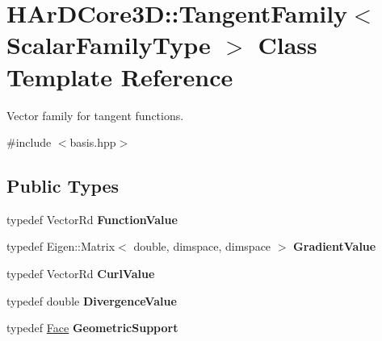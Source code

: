 \hypertarget{classHArDCore3D_1_1TangentFamily}{}\section{H\+Ar\+D\+Core3D\+:\+:Tangent\+Family$<$ Scalar\+Family\+Type $>$ Class Template Reference}
\label{classHArDCore3D_1_1TangentFamily}


Vector family for tangent functions.  




{\ttfamily \#include $<$basis.\+hpp$>$}

\subsection*{Public Types}
\begin{DoxyCompactItemize}
\item 
\mbox{\label{classHArDCore3D_1_1TangentFamily_a1124b8f08d201215ca7b2158460ad7f5}} 
typedef Vector\+Rd {\bfseries Function\+Value}
\item 
\mbox{\label{classHArDCore3D_1_1TangentFamily_acab8c05d4bd8bc9656bf038d2f092f55}} 
typedef Eigen\+::\+Matrix$<$ double, dimspace, dimspace $>$ {\bfseries Gradient\+Value}
\item 
\mbox{\label{classHArDCore3D_1_1TangentFamily_a849aca7abc07cabc56b61a5c112a2948}} 
typedef Vector\+Rd {\bfseries Curl\+Value}
\item 
\mbox{\label{classHArDCore3D_1_1TangentFamily_af9c94600e124f7825764aafd0827bf8b}} 
typedef double {\bfseries Divergence\+Value}
\item 
\mbox{\label{classHArDCore3D_1_1TangentFamily_a1b78f11229d89bdac125bd5b1f6983ef}} 
typedef \hyperlink{classHArDCore3D_1_1Face}{Face} {\bfseries Geometric\+Support}
\end{DoxyCompactItemize}
